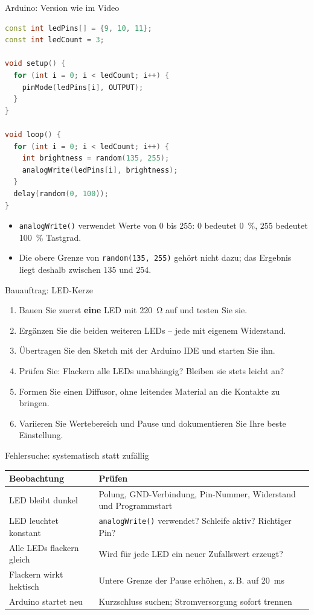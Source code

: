 \begin{frame}[fragile]{Arduino: Version wie im Video}
\begin{lstlisting}[language=C++,basicstyle=\ttfamily\scriptsize]
const int ledPins[] = {9, 10, 11};
const int ledCount = 3;

void setup() {
  for (int i = 0; i < ledCount; i++) {
    pinMode(ledPins[i], OUTPUT);
  }
}

void loop() {
  for (int i = 0; i < ledCount; i++) {
    int brightness = random(135, 255);
    analogWrite(ledPins[i], brightness);
  }
  delay(random(0, 100));
}
\end{lstlisting}
	\begin{itemize}
		\item \lstinline|analogWrite()| verwendet Werte von $0$ bis $255$:
		$0$ bedeutet \qty{0}{\percent}, $255$ bedeutet \qty{100}{\percent} Tastgrad.
		\item Die obere Grenze von \lstinline|random(135, 255)| gehört nicht dazu;
		das Ergebnis liegt deshalb zwischen $135$ und $254$.
	\end{itemize}
\end{frame}

\begin{frame}{Bauauftrag: LED-Kerze}
	\begin{enumerate}[<+->]
		\item Bauen Sie zuerst \textbf{eine} LED mit \qty{220}{\ohm} auf und testen Sie sie.
		\item Ergänzen Sie die beiden weiteren LEDs -- jede mit eigenem Widerstand.
		\item Übertragen Sie den Sketch mit der Arduino IDE und starten Sie ihn.
		\item Prüfen Sie: Flackern alle LEDs unabhängig? Bleiben sie stets leicht an?
		\item Formen Sie einen Diffusor, ohne leitendes Material an die Kontakte zu bringen.
		\item Variieren Sie Wertebereich und Pause und dokumentieren Sie Ihre beste Einstellung.
	\end{enumerate}
\end{frame}

\begin{frame}{Fehlersuche: systematisch statt zufällig}
	\begin{tabularx}{\textwidth}{@{}lX@{}}
		\toprule
		\textbf{Beobachtung} & \textbf{Prüfen} \\
		\midrule
		LED bleibt dunkel & Polung, GND-Verbindung, Pin-Nummer, Widerstand und Programmstart \\
		LED leuchtet konstant & \lstinline|analogWrite()| verwendet? Schleife aktiv? Richtiger Pin? \\
		Alle LEDs flackern gleich & Wird für jede LED ein neuer Zufallswert erzeugt? \\
		Flackern wirkt hektisch & Untere Grenze der Pause erhöhen, z.\,B. auf \qty{20}{\milli\second} \\
		Arduino startet neu & Kurzschluss suchen; Stromversorgung sofort trennen \\
		\bottomrule
	\end{tabularx}
\end{frame}

